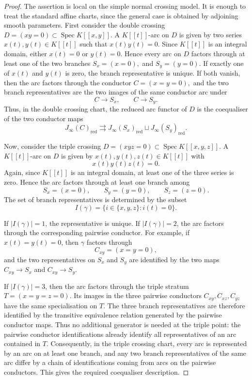 \documentclass[11pt]{amsart}
\numberwithin{equation}{section}
\theoremstyle{plain}
\theoremstyle{definition}
\newcommand{\Spec}{\operatorname{Spec}}
\newcommand{\red}{\mathrm{red}}
\begin{document}
\begin{proof}
The assertion is local on the simple normal crossing model.  It is enough to
treat the standard affine charts, since the general case is obtained by
adjoining smooth parameters.
First consider the double crossing
$
D=(xy=0)\subset \Spec K[[x,y]].
$
A \(K[[t]]\)-arc on \(D\) is given by two series \(x(t),y(t)\in K[[t]]\)
such that
$
x(t)y(t)=0.
$
Since \(K[[t]]\) is an integral domain, either \(x(t)=0\) or \(y(t)=0\).
Hence every arc on \(D\) factors through at least one of the two branches
$
S_x=(x=0), $ and $ S_y=(y=0).
$
If exactly one of \(x(t)\) and \(y(t)\) is zero, the branch representative is
unique.  If both vanish, then the arc factors through the conductor
$
C=(x=y=0),
$ 
and the two branch representatives are the two images of the same conductor
arc under
\[
C\longrightarrow S_x,
\qquad
C\longrightarrow S_y.
\]
Thus, in the double crossing chart, the reduced arc functor of \(D\) is the
coequaliser of the two conductor maps
\[
J_\infty(C)_{\red}
\rightrightarrows
J_\infty(S_x)_{\red}\sqcup J_\infty(S_y)_{\red}.
\]

Now, consider the triple crossing
$
D=(xyz=0)\subset \Spec K[[x,y,z]].$
A \(K[[t]]\)-arc on \(D\) is given by \(x(t),y(t),z(t)\in K[[t]]\) with
\[
x(t)y(t)z(t)=0.
\]
Again, since \(K[[t]]\) is an integral domain, at least one of the three
series is zero.  Hence the arc factors through at least one branch among
\[
S_x=(x=0),\qquad S_y=(y=0),\qquad S_z=(z=0).
\]
The set of branch representatives is determined by the subset
\[
I(\gamma)=\{i\in\{x,y,z\}: i(t)=0\}.
\]

If \(|I(\gamma)|=1\), the representative is unique.  If
\(|I(\gamma)|=2\), the arc factors through the corresponding pairwise
conductor.  For example, if \(x(t)=y(t)=0\), then \(\gamma\) factors through
\[
C_{xy}=(x=y=0),
\]
and the two representatives on \(S_x\) and \(S_y\) are identified by the two
maps \(C_{xy}\to S_x\) and \(C_{xy}\to S_y\).

If \(|I(\gamma)|=3\), then the arc factors through the triple stratum
$
T=(x=y=z=0).
$
Its images in the three pairwise conductors \(C_{xy},C_{xz},C_{yz}\) have the
same specialisation on \(T\).  The three branch representatives are therefore
identified by the transitive equivalence relation generated by the pairwise
conductor maps.  Thus no additional generator is needed at the triple point:
the pairwise conductor identifications already identify all representatives
of an arc contained in \(T\).
Consequently, in the triple crossing chart, every arc is represented by an
arc on at least one branch, and any two branch representatives of the same
arc differ by a chain of identifications coming from arcs on the pairwise
conductors.  This gives the required coequaliser description.


\end{proof}
\end{document}
